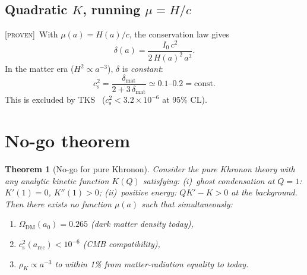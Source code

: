 \documentclass[prd,twocolumn,superscriptaddress,longbibliography,floatfix]{revtex4-2}
\newtheorem{theorem}{Theorem}
\newcommand{\cs}{c_{\mathrm{s}}}
\newcommand{\proven}{\textsc{[proven]}}
\begin{document}
\subsection{Quadratic $K$, running $\mu = H/c$}
\label{sec:case2}

\proven\ With $\mu(a) = H(a)/c$, the conservation law
gives
\begin{equation}
\delta(a) = \frac{I_0\,c^2}{2\,H(a)^2\,a^3}.
\label{eq:delta_running}
\end{equation}
In the matter era ($H^2 \propto a^{-3}$), $\delta$
is \emph{constant}:
\begin{equation}
\cs^2 = \frac{\delta_{\mathrm{mat}}}{2+3\,\delta_{\mathrm{mat}}}
\simeq 0.1\text{--}0.2 = \mathrm{const}.
\label{eq:cs2_running}
\end{equation}
This is excluded by TKS~\cite{TKS2016}
($\cs^2 < 3.2\times10^{-6}$ at 95\% CL).


\section{No-go theorem}
\label{sec:nogo}

\begin{theorem}[No-go for pure Khronon]
\label{thm:nogo}
Consider the pure Khronon theory with any analytic
kinetic function $K(Q)$ satisfying:
\textup{(i)}~ghost condensation at $Q = 1$:
$K'(1) = 0$, $K''(1) > 0$;
\textup{(ii)}~positive energy:
$QK' - K > 0$ at the background.
Then there exists no function $\mu(a)$ such that
simultaneously:
\begin{enumerate}
\item $\Omega_{\mathrm{DM}}(a_0) = 0.265$ (dark matter density today),
\item $\cs^2(a_{\mathrm{rec}}) < 10^{-6}$ (CMB compatibility),
\item $\rho_K \propto a^{-3}$ to within 1\% from
  matter-radiation equality to today.
\end{enumerate}
\end{theorem}
\end{document}
